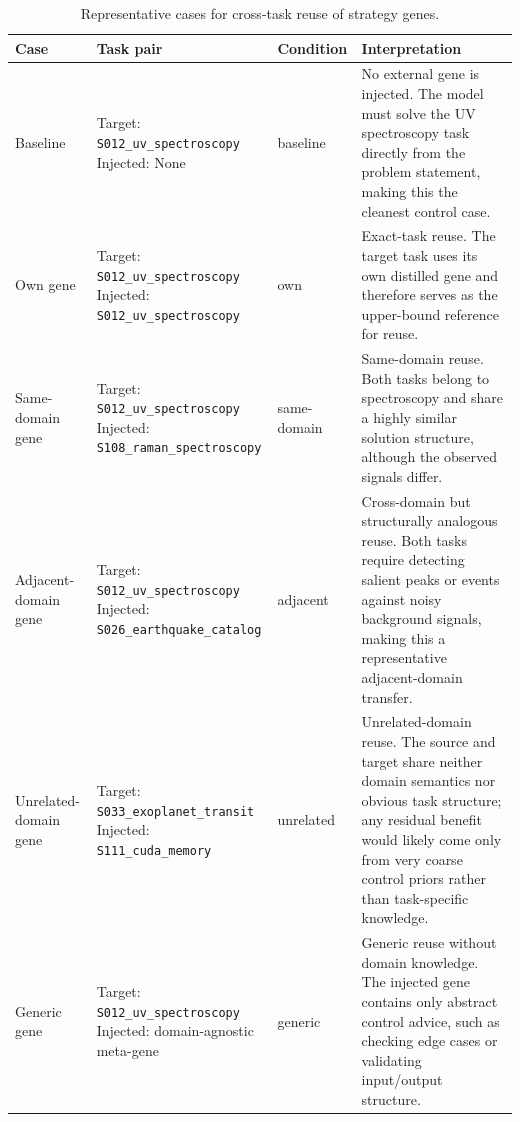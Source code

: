 \documentclass{article}
\begin{document}
\begin{table}[t]
\centering
\small
\setlength{\tabcolsep}{5pt}
\renewcommand{\arraystretch}{1.15}
\caption{Representative cases for cross-task reuse of strategy genes.}
\label{tab:gene_reuse_cases}
\begin{tabularx}{\textwidth}{p{2.0cm} p{5.0cm} p{1.8cm} X}
\toprule
\textbf{Case} & \textbf{Task pair} & \textbf{Condition} & \textbf{Interpretation} \\
\midrule

Baseline
& \makecell[l]{Target: \texttt{S012\_uv\_spectroscopy} \\ Injected: None}
& baseline
& No external gene is injected. The model must solve the UV spectroscopy task directly from the problem statement, making this the cleanest control case. \\

Own gene
& \makecell[l]{Target: \texttt{S012\_uv\_spectroscopy} \\ Injected: \texttt{S012\_uv\_spectroscopy}}
& own
& Exact-task reuse. The target task uses its own distilled gene and therefore serves as the upper-bound reference for reuse. \\

Same-domain gene
& \makecell[l]{Target: \texttt{S012\_uv\_spectroscopy} \\ Injected: \texttt{S108\_raman\_spectroscopy}}
& same-domain
& Same-domain reuse. Both tasks belong to spectroscopy and share a highly similar solution structure, although the observed signals differ. \\

Adjacent-domain gene
& \makecell[l]{Target: \texttt{S012\_uv\_spectroscopy} \\ Injected: \texttt{S026\_earthquake\_catalog}}
& adjacent
& Cross-domain but structurally analogous reuse. Both tasks require detecting salient peaks or events against noisy background signals, making this a representative adjacent-domain transfer. \\

Unrelated-domain gene
& \makecell[l]{Target: \texttt{S033\_exoplanet\_transit} \\ Injected: \texttt{S111\_cuda\_memory}}
& unrelated
& Unrelated-domain reuse. The source and target share neither domain semantics nor obvious task structure; any residual benefit would likely come only from very coarse control priors rather than task-specific knowledge. \\

Generic gene
& \makecell[l]{Target: \texttt{S012\_uv\_spectroscopy} \\ Injected: domain-agnostic meta-gene}
& generic
& Generic reuse without domain knowledge. The injected gene contains only abstract control advice, such as checking edge cases or validating input/output structure. \\

\bottomrule
\end{tabularx}
\end{table}
\end{document}
